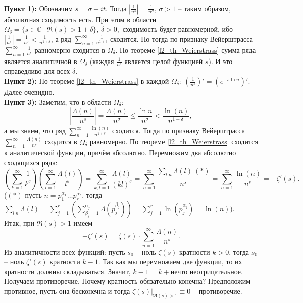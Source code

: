 \begin{pf}~\\
	\textbf{Пункт 1):} Обозначим $s=\sigma+it.$ Тогда $\displaystyle \left| \frac{1}{n^s} \right| = \frac{1}{n^\sigma},\,\sigma > 1$ -- таким образом, абсолютная сходимость есть. При этом в области $\Omega_\delta = \{ s \in \mathbb{C} \ | \ \Re(s) > 1+\delta \},\, \delta>0,$ сходимость будет равномерной, ибо $\displaystyle \left| \frac{1}{n^s} \right| = \frac{1}{n^\sigma} < \frac{1}{n^{1+\delta}}$, а ряд $\displaystyle \sum\limits_{n=1}^\infty \frac{1}{n^{1+\delta}}$ сходится. Но тогда по признаку Вейерштрасса $\displaystyle \sum\limits_{n=1}^\infty \frac{1}{n^s}$ равномерно сходится в $\Omega_\delta.$ По теореме \ref{l2_th_Weierstrass} сумма ряда является аналитичной в $\Omega_\delta$ (каждая $\displaystyle \frac{1}{n^s}$ является целой функцией $s$). И это справедливо для всех $\delta$.\\
	\textbf{Пункт 2):} По теореме \ref{l2_th_Weierstrass} в каждой $\displaystyle \Omega_\delta: \ \left(\frac{1}{n^s}\right)' = \left(e^{-s \ln n}\right)'.$ Далее очевидно.\\
	\textbf{Пункт 3):} Заметим, что в области $\displaystyle \Omega_\delta:$ $$\left| \frac{\Lambda(n)}{n^s} \right| = \frac{\Lambda(n)}{n^\sigma} \leq \frac{\ln n}{n^\sigma} < \frac{\ln(n)}{n^{1+\delta}},$$ а мы знаем, что ряд $\displaystyle \sum\limits_{n=1}^\infty \frac{\ln(n)}{n^{1+\delta}}$ сходится. Тогда по признаку Вейерштрасса $\displaystyle \sum\limits_{n=1}^\infty \frac{\Lambda(n)}{n^s}$ сходится в $\Omega_\delta$ равномерно. По теореме \ref{l2_th_Weierstrass} сходится к аналитической функции, причём абсолютно. Перемножим два абсолютно сходящихся ряда: 
		$$\left( \sum\limits_{k=1}^\infty \frac{1}{k^s} \right)\left( \sum\limits_{l=1}^\infty \frac{\Lambda(l)}{l^s} \right) = \sum\limits_{k,l=1}^\infty \frac{\Lambda(l)}{(kl)^s} = \sum\limits_{n=1}^\infty \frac{\sum_{l | n}\Lambda(l) \ (\ast)}{n^s} = \sum\limits_{n=1}^\infty \frac{\ln(n)}{n^s} = -\zeta'(s).$$
		($(\ast)$ пусть $n = p_1^{\alpha_1}\dots p_r^{\alpha_r}$, тогда $\displaystyle \sum\limits_{l | n}\Lambda(l) = \sum\limits_{j=1}^r \left( \sum\limits_{\beta_j=1}^{\alpha_j} \Lambda\left(p_j^{\beta_j} \right) \right) = \sum\limits_{j=1}^r \ln\left( p_j^{\alpha_j} \right) = \ln(n)$).\\
	Итак, при $\Re(s)>1$ имеем 
		$$-\zeta'(s) = \zeta(s) \cdot \sum\limits_{n=1}^\infty \frac{\Lambda(n)}{n^s}.$$ 
	Из аналитичности всех функций: пусть $s_0$ -- ноль $\zeta(s)$ кратности $k>0$, тогда $s_0$ -- ноль $\zeta'(s)$ кратности $k-1$. Так как мы перемножаем две функции, то их кратности должны складываться. Значит, $k-1=k+$нечто неотрицательное.  Получаем противоречие. Почему кратность обязательно конечна? Предположим противное, пусть она бесконечна и тогда $\zeta(s)|_{\Re(s)>1} \equiv 0$ -- противоречие.
\end{pf}

